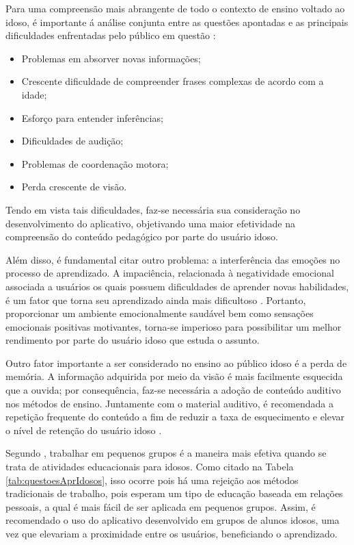 Para uma compreensão mais abrangente de todo o contexto de ensino voltado ao idoso, é importante á análise conjunta entre as questões apontadas e as principais dificuldades enfrentadas pelo público em questão \citep{euromed}:

\begin{itemize}
    \item Problemas em absorver novas informações;
    \item Crescente dificuldade de compreender frases complexas de acordo com a idade;
    \item Esforço para entender inferências;
    \item Dificuldades de audição;
    \item Problemas de coordenação motora;
    \item Perda crescente de visão.
\end{itemize}

Tendo em vista tais dificuldades, faz-se necessária sua consideração no desenvolvimento do aplicativo, objetivando uma maior efetividade na compreensão do conteúdo pedagógico por parte do usuário idoso.

Além disso, é fundamental citar outro problema: a interferência das emoções no processo de aprendizado. A impaciência, relacionada à negatividade emocional associada a usuários os quais possuem dificuldades de aprender novas habilidades, é um fator que torna seu aprendizado ainda mais dificultoso \citep{Edukacja}. Portanto, proporcionar um ambiente emocionalmente saudável bem como sensações emocionais positivas motivantes, torna-se imperioso para possibilitar um melhor rendimento por parte do usuário idoso que estuda o assunto.

Outro fator importante a ser considerado no ensino ao público idoso é a perda de memória. A informação adquirida por meio da visão é mais facilmente esquecida que a ouvida; por consequência,  faz-se necessária a adoção de conteúdo auditivo nos métodos de ensino. Juntamente com o material auditivo, é recomendada a repetição frequente do conteúdo a fim de reduzir a taxa de esquecimento e elevar o nível de retenção do usuário idoso \citep{euromed}.

Segundo \cite{Edukacja}, trabalhar em pequenos grupos é a maneira mais efetiva quando se trata de atividades educacionais para idosos. Como citado na Tabela \ref{tab:questoesAprIdosos}, isso ocorre pois há uma rejeição aos métodos tradicionais de trabalho, pois esperam um tipo de educação baseada em relações pessoais, a qual é mais fácil de ser aplicada em pequenos grupos. Assim, é recomendado o uso do aplicativo desenvolvido em grupos de alunos idosos, uma vez que elevariam a proximidade entre os usuários, beneficiando o aprendizado.

